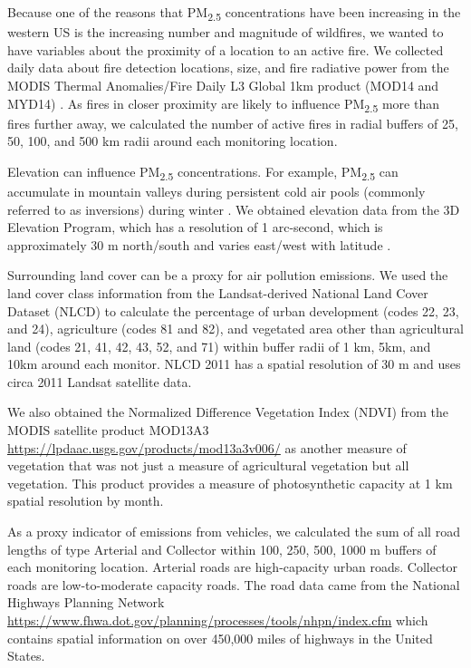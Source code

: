 \documentclass[english]{article}
\begin{document}
Because one of the reasons that PM\textsubscript{2.5} concentrations have been increasing in the western US is the increasing number and magnitude of wildfires, we wanted to have variables about the proximity of a location to an active fire. We collected daily data about fire detection locations, size, and fire radiative power from the MODIS Thermal Anomalies/Fire Daily L3 Global 1km product (MOD14 and MYD14) \cite{Giglio2006,Hawbaker2017}. As fires in closer proximity are likely to influence PM\textsubscript{2.5} more than fires further away, we calculated the number of active fires in radial buffers of 25, 50, 100, and 500 km radii around each monitoring location. 

Elevation can influence PM\textsubscript{2.5} concentrations. For example, PM\textsubscript{2.5} can accumulate in mountain valleys during persistent cold air pools (commonly referred to as inversions) 
during winter \cite{Whiteman2014}. We obtained elevation data from the 3D Elevation Program, which has a resolution of 1 arc-second, which is approximately 30 m north/south and varies east/west with latitude \cite{USGSElevation2017}.

Surrounding land cover can be a proxy for air pollution emissions. We used the land cover class information from the Landsat-derived National Land Cover Dataset (NLCD) \cite{Homer2017} to calculate the percentage of urban development (codes 22, 23, and 24), agriculture (codes 81 and 82), and vegetated area other than agricultural land (codes 21, 41, 42, 43, 52, and 71) within buffer radii of 1 km, 5km, and 10km around each monitor. NLCD 2011 has a spatial resolution of 30 m and uses circa 2011 Landsat satellite data. 

We also obtained the Normalized Difference Vegetation Index (NDVI) from the MODIS satellite product MOD13A3 \url{https://lpdaac.usgs.gov/products/mod13a3v006/} as another measure of vegetation that was not just a measure of agricultural vegetation but all vegetation. This product provides a measure of photosynthetic capacity at 1 km spatial resolution by month. 

As a proxy indicator of emissions from vehicles, we calculated the sum of all road lengths of type Arterial and Collector within 100, 250, 500, 1000 m buffers of each monitoring location. Arterial roads are high-capacity urban roads. Collector roads are low-to-moderate capacity roads. The road data came from the National Highways Planning Network \url{https://www.fhwa.dot.gov/planning/processes/tools/nhpn/index.cfm} which contains spatial information on over 450,000 miles of highways in the United States. 
\end{document}
